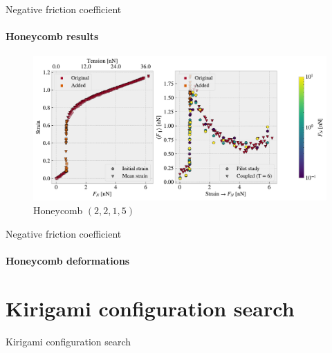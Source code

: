 \documentclass[
	10pt, %
]{beamer}
\begin{document}
\begin{frame}{Negative friction coefficient}
	\framesubtitle{Honeycomb results}
	\begin{figure}[H]
		\centering
		\includegraphics[width=\linewidth]{../thesis/figures/negative_coefficient/manual_coupling_tension_hon2215.pdf}	
	\caption{Honeycomb $(2,2,1,5)$}
	\end{figure}	
\end{frame}
%
%
\begin{frame}{Negative friction coefficient}
	\framesubtitle{Honeycomb deformations}
	\begin{figure}
		\centering    
	\end{figure} 
\end{frame}

%
%
\section{Kirigami configuration search} %
\begin{frame}{Kirigami configuration search}
    \tableofcontents[currentsection]
\end{frame}
%
%
\end{document}
